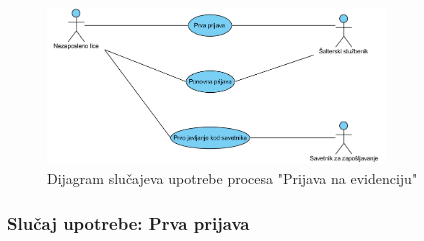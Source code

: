 \begin{figure}[H]
	\centering
	\includegraphics[width=0.8\textwidth]{dijagrami/dijagrami-slucajeva-upotrebe/prijava-na-evidenciju.png}
	\caption{Dijagram slu\v cajeva upotrebe procesa "Prijava na evidenciju"}
	\label{dsu: prijava na evidenciju}
\end{figure}

\subsubsection{Slu\v caj upotrebe: Prva prijava}
\label{su: prva prijava}

